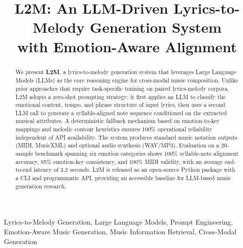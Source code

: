 \documentclass[conference]{IEEEtran}
\begin{document}
\title{L2M: An LLM-Driven Lyrics-to-Melody Generation System\\
       with Emotion-Aware Alignment}

\author{
  \and
}

\maketitle

\begin{abstract}
We present \textbf{L2M}, a lyrics-to-melody generation system that leverages
Large Language Models (LLMs) as the core reasoning engine for cross-modal
music composition. Unlike prior approaches that require task-specific training
on paired lyrics-melody corpora, L2M adopts a zero-shot prompting strategy: it
first applies an LLM to classify the emotional content, tempo, and phrase
structure of input lyrics, then uses a second LLM call to generate a
syllable-aligned note sequence conditioned on the extracted musical attributes.
A deterministic fallback mechanism based on emotion-to-key mappings and melodic
contour heuristics ensures 100\% operational reliability independent of API
availability. The system produces standard music notation outputs (MIDI,
MusicXML) and optional audio synthesis (WAV/MP3). Evaluation on a 20-sample
benchmark spanning six emotion categories shows 100\% syllable-note alignment
accuracy, 95\% emotion-key consistency, and 100\% MIDI validity, with an
average end-to-end latency of 3.2 seconds. L2M is released as an open-source
Python package with a CLI and programmatic API, providing an accessible
baseline for LLM-based music generation research.
\end{abstract}

\begin{IEEEkeywords}
Lyrics-to-Melody Generation, Large Language Models, Prompt Engineering,
Emotion-Aware Music Generation, Music Information Retrieval, Cross-Modal
Generation
\end{IEEEkeywords}
\end{document}
